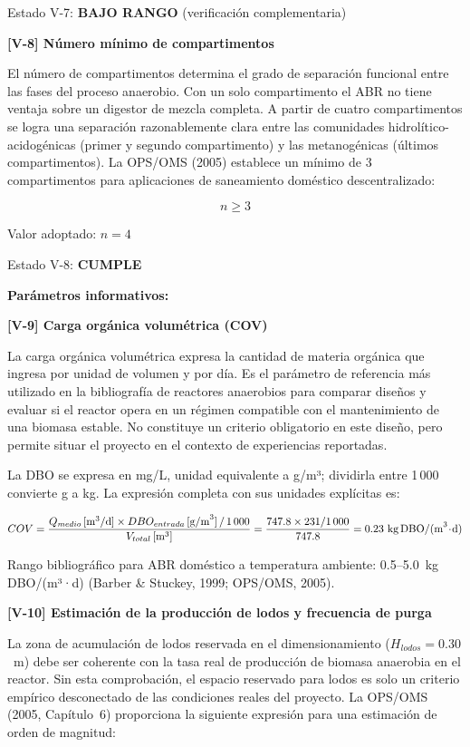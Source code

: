 \documentclass[12pt,a4paper]{article}
\begin{document}
Estado V-7: \textbf{BAJO RANGO} (verificación complementaria)

\textbf{[V-8] Número mínimo de compartimentos}

El número de compartimentos determina el grado de separación funcional entre las fases del proceso anaerobio. Con un solo compartimento el ABR no tiene ventaja sobre un digestor de mezcla completa. A partir de cuatro compartimentos se logra una separación razonablemente clara entre las comunidades hidrolítico-acidogénicas (primer y segundo compartimento) y las metanogénicas (últimos compartimentos). La OPS/OMS (2005) establece un mínimo de 3 compartimentos para aplicaciones de saneamiento doméstico descentralizado:

\begin{equation}
n \geq 3
\end{equation}

Valor adoptado: $n = 4$

Estado V-8: \textbf{CUMPLE}

\textbf{Parámetros informativos:}

\textbf{[V-9] Carga orgánica volumétrica (COV)}

La carga orgánica volumétrica expresa la cantidad de materia orgánica que ingresa por unidad de volumen y por día. Es el parámetro de referencia más utilizado en la bibliografía de reactores anaerobios para comparar diseños y evaluar si el reactor opera en un régimen compatible con el mantenimiento de una biomasa estable. No constituye un criterio obligatorio en este diseño, pero permite situar el proyecto en el contexto de experiencias reportadas.

La DBO se expresa en mg/L, unidad equivalente a g/m³; dividirla entre 1\,000 convierte g a kg. La expresión completa con sus unidades explícitas es:

\begin{equation}
COV = \frac{Q_{medio} \,[\text{m}^3/\text{d}] \times DBO_{entrada} \,[\text{g/m}^3] \,/\, 1\,000}{V_{total} \,[\text{m}^3]} = \frac{747.8 \times 231 / 1\,000}{747.8} = 0.23 \text{ kg\,DBO/(m}^3\!\cdot\!\text{d)}
\end{equation}

Rango bibliográfico para ABR doméstico a temperatura ambiente: 0.5--5.0~kg\,DBO/(m³·d) (Barber \& Stuckey, 1999; OPS/OMS, 2005).

\textbf{[V-10] Estimación de la producción de lodos y frecuencia de purga}

La zona de acumulación de lodos reservada en el dimensionamiento ($H_{lodos} = 0.30$~m) debe ser coherente con la tasa real de producción de biomasa anaerobia en el reactor. Sin esta comprobación, el espacio reservado para lodos es solo un criterio empírico desconectado de las condiciones reales del proyecto. La OPS/OMS (2005, Capítulo~6) proporciona la siguiente expresión para una estimación de orden de magnitud:
\end{document}
